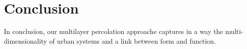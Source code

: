 \documentclass{jimis-en}
\begin{document}
\section{Conclusion}

In conclusion, our multilayer percolation approache captures in a way the multi-dimensionality of urban systems and a link between form and function.




































%

\end{document}
